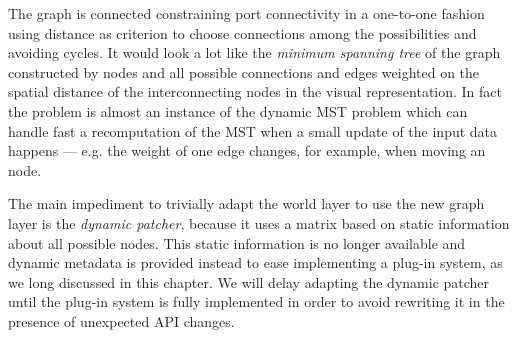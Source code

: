 %

The graph is connected constraining port connectivity in a one-to-one
fashion using distance as criterion to choose connections among the
possibilities and avoiding cycles. It would look a lot like the
\emph{minimum spanning tree} of the graph constructed by nodes and all
possible connections and edges weighted on the spatial distance of the
interconnecting nodes in the visual representation. In fact the
problem is almost an instance of the dynamic MST problem
\cite{spira75dmst} which can handle fast a recomputation of the MST
when a small update of the input data happens --- e.g. the weight of
one edge changes, for example, when moving an node.

The main impediment to trivially adapt the world layer to use the new
graph layer is the \emph{dynamic patcher}, because it uses a matrix
based on static information about all possible nodes. This static
information is no longer available and dynamic metadata is provided
instead to ease implementing a plug-in system, as we long discussed in
this chapter. We will delay adapting the dynamic patcher until the
plug-in system is fully implemented in order to avoid rewriting it in
the presence of unexpected API changes.


